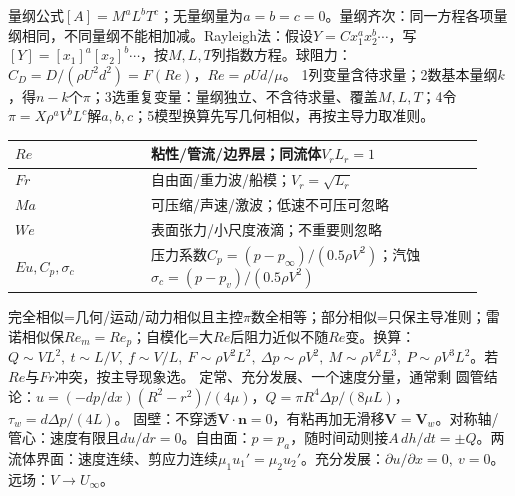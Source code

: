 量纲公式$[A]=M^aL^bT^c$；无量纲量为$a=b=c=0$。量纲齐次：同一方程各项量纲相同，不同量纲不能相加减。Rayleigh法：假设$Y=Cx_1^ax_2^b\cdots$，写$[Y]=[x_1]^a[x_2]^b\cdots$，按$M,L,T$列指数方程。球阻力：$C_D=D/(\rho U^2d^2)=F(Re)$，$Re=\rho Ud/\mu$。
1列变量含待求量；2数基本量纲$k$，得$n-k$个$\pi$；3选重复变量：量纲独立、不含待求量、覆盖$M,L,T$；4令$\pi=X\rho^aV^bL^c$解$a,b,c$；5模型换算先写几何相似，再按主导力取准则。
\begin{tabular}{|p{0.27\linewidth}|p{0.66\linewidth}|}\hline
$Re$ & 粘性/管流/边界层；同流体$V_rL_r=1$\\\hline
$Fr$ & 自由面/重力波/船模；$V_r=\sqrt{L_r}$\\\hline
$Ma$ & 可压缩/声速/激波；低速不可压可忽略\\\hline
$We$ & 表面张力/小尺度液滴；不重要则忽略\\\hline
$Eu,C_p,\sigma_c$ & 压力系数$C_p=(p-p_\infty)/(0.5\rho V^2)$；汽蚀$\sigma_c=(p-p_v)/(0.5\rho V^2)$\\\hline
\end{tabular}
完全相似=几何/运动/动力相似且主控$\pi$数全相等；部分相似=只保主导准则；雷诺相似保$Re_m=Re_p$；自模化=大$Re$后阻力近似不随$Re$变。换算：$Q\sim VL^2,\ t\sim L/V,\ f\sim V/L,\ F\sim\rho V^2L^2,\ \Delta p\sim\rho V^2,\ M\sim\rho V^2L^3,\ P\sim\rho V^3L^2$。若$Re$与$Fr$冲突，按主导现象选。
定常、充分发展、一个速度分量，通常剩
圆管结论：$u=(-dp/dx)(R^2-r^2)/(4\mu)$，$Q=\pi R^4\Delta p/(8\mu L)$，$\tau_w=d\Delta p/(4L)$。
固壁：不穿透$\bm V\cdot\bm n=0$，有粘再加无滑移$\bm V=\bm V_w$。对称轴/管心：速度有限且$du/dr=0$。自由面：$p=p_a$，随时间动则接$A\,dh/dt=\pm Q$。两流体界面：速度连续、剪应力连续$\mu_1u_1'=\mu_2u_2'$。充分发展：$\partial u/\partial x=0,\ v=0$。远场：$V\to U_\infty$。

